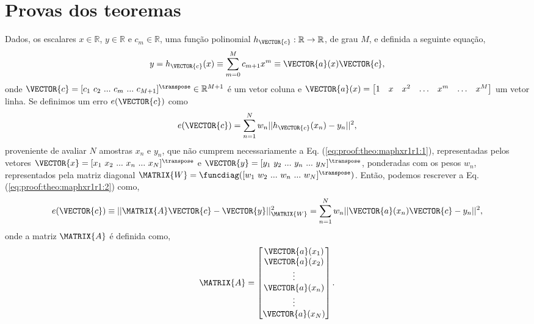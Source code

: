 \section{Provas dos teoremas}
 
\begin{myproofT}\label{proof:theo:maphxr1r1}
Dados,
os escalares $x \in \mathbb{R}$, $y \in \mathbb{R}$ e $c_m \in \mathbb{R}$,
uma função polinomial $h_{\VECTOR{c}}:\mathbb{R} \rightarrow \mathbb{R}$, de grau $M$, e 
definida a seguinte equação,
\begin{equation}\label{eq:proof:theo:maphxr1r1:1}
y=h_{\VECTOR{c}}(x)\equiv \sum_{m=0}^{M}c_{m+1} x^m\equiv \VECTOR{a}(x)\VECTOR{c},
\end{equation}
onde $\VECTOR{c}=[c_1~ c_2~ ...~ c_m~ ...~ c_{M+1}]^{\transpose} \in \mathbb{R}^{M+1}$ é um vetor coluna e
$\VECTOR{a}(x)=\begin{bmatrix} 
1& x& x^2& \hdots & x^m& \hdots& x^M
\end{bmatrix}$ um vetor linha.
Se definimos um erro $e(\VECTOR{c})$ como
\begin{equation}\label{eq:proof:theo:maphxr1r1:2}
e(\VECTOR{c}) =  \sum_{n=1}^{N} w_n||h_{\VECTOR{c}}(x_n)-y_n||^2,
\end{equation}
proveniente de avaliar $N$ amostras $x_n$ e $y_n$, 
que não cumprem necessariamente a Eq. (\ref{eq:proof:theo:maphxr1r1:1}), 
representadas pelos vetores $\VECTOR{x}=[x_1~ x_2~ ...~ x_n~ ...~ x_N]^{\transpose}$ e $\VECTOR{y}=[y_1~ y_2~ ...~ y_n~ ...~ y_N]^{\transpose}$,
ponderadas com os pesos $w_n$, representados pela matriz diagonal $\MATRIX{W}=\funcdiag([w_1~ w_2~ ...~ w_n~ ...~ w_N]^{\transpose})$.
Então, podemos rescrever a Eq. (\ref{eq:proof:theo:maphxr1r1:2}) como,
\begin{equation}\label{eq:proof:theo:maphxr1r1:3}
e(\VECTOR{c}) \equiv ||\MATRIX{A}\VECTOR{c}-\VECTOR{y}||_{\MATRIX{W}}^2 =  \sum_{n=1}^{N} w_n||\VECTOR{a}(x_n)\VECTOR{c}-y_n||^2,
\end{equation}
onde a matriz $\MATRIX{A}$ é definida como,
\begin{equation}\label{eq:proof:maphxr1r1:4}
\MATRIX{A}=\begin{bmatrix}
\VECTOR{a}(x_1)\\
\VECTOR{a}(x_2)\\
\vdots\\
\VECTOR{a}(x_n)\\
\vdots\\
\VECTOR{a}(x_N)\\
\end{bmatrix}.
\end{equation}



\end{myproofT}
